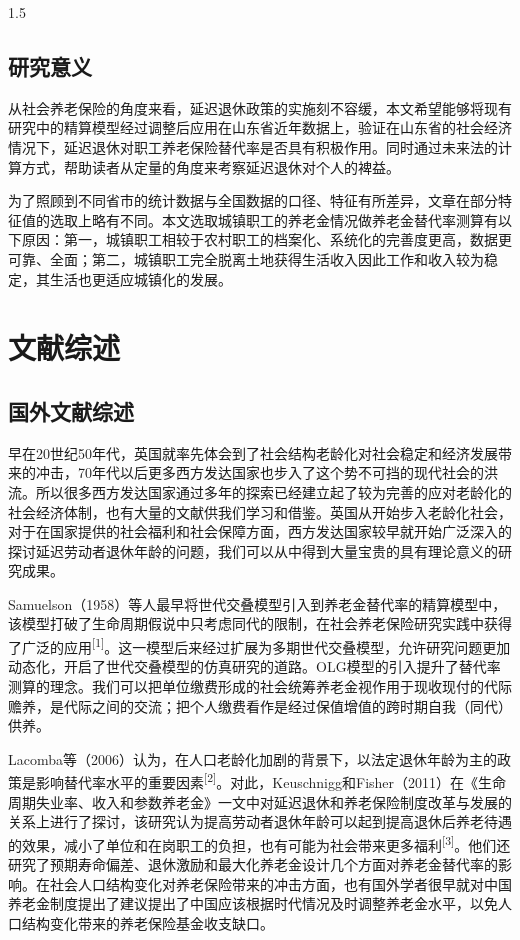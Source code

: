 \documentclass[a4paper,12pt]{ctexart}
\numberwithin{equation}{section}
\begin{document}
\begin{spacing}{1.5}
\subsection{研究意义}

从社会养老保险的角度来看，延迟退休政策的实施刻不容缓，本文希望能够将现有研究中的精算模型经过调整后应用在山东省近年数据上，验证在山东省的社会经济情况下，延迟退休对职工养老保险替代率是否具有积极作用。同时通过未来法的计算方式，帮助读者从定量的角度来考察延迟退休对个人的裨益。

为了照顾到不同省市的统计数据与全国数据的口径、特征有所差异，文章在部分特征值的选取上略有不同。本文选取城镇职工的养老金情况做养老金替代率测算有以下原因：第一，城镇职工相较于农村职工的档案化、系统化的完善度更高，数据更可靠、全面；第二，城镇职工完全脱离土地获得生活收入因此工作和收入较为稳定，其生活也更适应城镇化的发展。

\section{文献综述}

\subsection{国外文献综述}

早在20世纪50年代，英国就率先体会到了社会结构老龄化对社会稳定和经济发展带来的冲击，70年代以后更多西方发达国家也步入了这个势不可挡的现代社会的洪流。所以很多西方发达国家通过多年的探索已经建立起了较为完善的应对老龄化的社会经济体制，也有大量的文献供我们学习和借鉴。英国从开始步入老龄化社会，对于在国家提供的社会福利和社会保障方面，西方发达国家较早就开始广泛深入的探讨延迟劳动者退休年龄的问题，我们可以从中得到大量宝贵的具有理论意义的研究成果。

Samuelson（1958）等人最早将世代交叠模型引入到养老金替代率的精算模型中，该模型打破了生命周期假说中只考虑同代的限制，在社会养老保险研究实践中获得了广泛的应用\textsuperscript{[1]}。这一模型后来经过扩展为多期世代交叠模型，允许研究问题更加动态化，开启了世代交叠模型的仿真研究的道路。OLG模型的引入提升了替代率测算的理念。我们可以把单位缴费形成的社会统筹养老金视作用于现收现付的代际赡养，是代际之间的交流；把个人缴费看作是经过保值增值的跨时期自我（同代）供养。

Lacomba等（2006）认为，在人口老龄化加剧的背景下，以法定退休年龄为主的政策是影响替代率水平的重要因素\textsuperscript{[2]}。对此，Keuschnigg和Fisher（2011）在《生命周期失业率、收入和参数养老金》一文中对延迟退休和养老保险制度改革与发展的关系上进行了探讨，该研究认为提高劳动者退休年龄可以起到提高退休后养老待遇的效果，减小了单位和在岗职工的负担，也有可能为社会带来更多福利\textsuperscript{[3]}。他们还研究了预期寿命偏差、退休激励和最大化养老金设计几个方面对养老金替代率的影响。在社会人口结构变化对养老保险带来的冲击方面，也有国外学者很早就对中国养老金制度提出了建议提出了中国应该根据时代情况及时调整养老金水平，以免人口结构变化带来的养老保险基金收支缺口。


\end{spacing}
\end{document}
